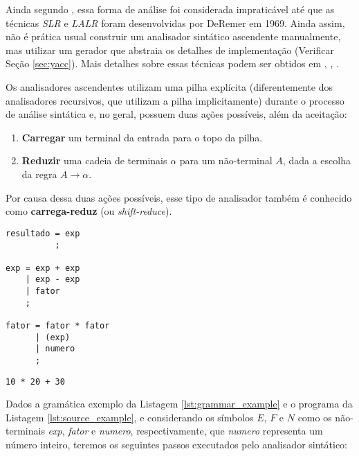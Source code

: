 Ainda segundo , essa forma de análise foi
considerada impraticável até que as técnicas \emph{SLR} e \emph{LALR}
foram desenvolvidas por DeRemer em 1969. Ainda assim, não é prática usual
construir um analisador sintático ascendente manualmente, mas utilizar um
gerador que abstraia os detalhes de implementação (Verificar Seção
\ref{sec:yacc}). Mais detalhes sobre essas técnicas podem ser obtidos em
, , .

Os analisadores ascendentes utilizam uma pilha explícita (diferentemente dos
analisadores recursivos, que utilizam a pilha implicitamente) durante o processo de
análise sintática e, no geral, possuem duas ações possíveis, além da aceitação:

\begin{enumerate}
	\item \textbf{Carregar} um terminal da entrada para o topo da pilha.
	\item \textbf{Reduzir} uma cadeia de terminais $\alpha$ para um não-terminal
	      $A$, dada a escolha da regra $A \rightarrow \alpha$.
\end{enumerate}

Por causa dessa duas ações possíveis, esse tipo de analisador também é
conhecido como \textbf{carrega-reduz} (ou \emph{shift-reduce}).

\begin{lstlisting}[label=lst:grammar_example, caption=Gramática Exemplo]
resultado = exp
          ;

exp = exp + exp
    | exp - exp
    | fator
    ;

fator = fator * fator
      | (exp)
      | numero
      ;
\end{lstlisting}

\begin{lstlisting}[label=lst:source_example, caption=Programa Exemplo]
10 * 20 + 30
\end{lstlisting}

Dados a gramática exemplo da Listagem \ref{lst:grammar_example} e o programa
da Listagem \ref{lst:source_example}, e considerando os símbolos $E$, $F$
e $N$ como os não-terminais \emph{exp}, \emph{fator} e \emph{numero},
respectivamente, que \emph{numero} representa um número inteiro, teremos os
seguintes passos executados pelo analisador sintático:

